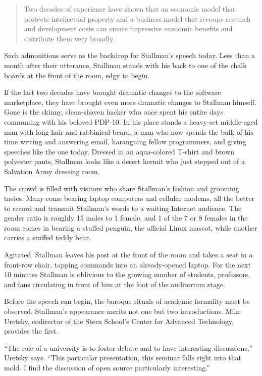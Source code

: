 \begin{quote}
Two decades of experience have shown that an economic model that protects intellectual property and a business model that recoups research and development costs can create impressive economic benefits and distribute them very broadly.
\end{quote}

Such admonitions serve as the backdrop for Stallman's speech today. Less than a month after their utterance, Stallman stands with his back to one of the chalk boards at the front of the room, edgy to begin.

If the last two decades have brought dramatic changes to the software marketplace, they have brought even more dramatic changes to Stallman himself. Gone is the skinny, clean-shaven hacker who once spent his entire days communing with his beloved PDP-10. In his place stands a heavy-set middle-aged man with long hair and rabbinical beard, a man who now spends the bulk of his time writing and answering email, haranguing fellow programmers, and giving speeches like the one today. Dressed in an aqua-colored T-shirt and brown polyester pants, Stallman looks like a desert hermit who just stepped out of a Salvation Army dressing room.

The crowd is filled with visitors who share Stallman's fashion and grooming tastes. Many come bearing laptop computers and cellular modems, all the better to record and transmit Stallman's words to a waiting Internet audience. The gender ratio is roughly 15 males to 1 female, and 1 of the 7 or 8 females in the room comes in bearing a stuffed penguin, the official Linux mascot, while another carries a stuffed teddy bear.

Agitated, Stallman leaves his post at the front of the room and takes a seat in a front-row chair, tapping commands into an already-opened laptop. For the next 10 minutes Stallman is oblivious to the growing number of students, professors, and fans circulating in front of him at the foot of the auditorium stage.

Before the speech can begin, the baroque rituals of academic formality must be observed. Stallman's appearance merits not one but two introductions. Mike Uretsky, codirector of the Stern School's Center for Advanced Technology, provides the first.

``The role of a university is to foster debate and to have interesting discussions,'' Uretsky says. ``This particular presentation, this seminar falls right into that mold. I find the discussion of open source particularly interesting.''

